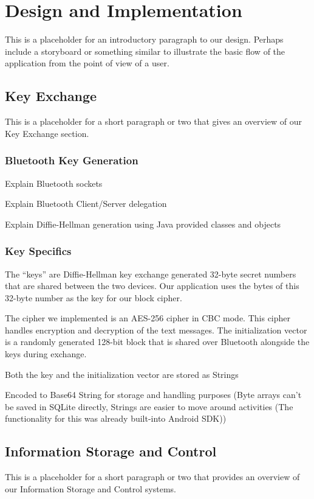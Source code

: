 \section{Design and Implementation}
This is a placeholder for an introductory paragraph to our design. Perhaps include a storyboard or something similar to illustrate the basic flow of the application
from the point of view of a user.

\subsection{Key Exchange}
This is a placeholder for a short paragraph or two that gives an overview of our Key Exchange section.

\subsubsection{Bluetooth Key Generation}
Explain Bluetooth sockets

Explain Bluetooth Client/Server delegation

Explain Diffie-Hellman generation using Java provided classes and objects

\subsubsection{Key Specifics}
The ``keys'' are Diffie-Hellman key exchange generated 32-byte secret numbers that are shared between
the two devices. Our application uses the bytes of this 32-byte number as the key for our block cipher.

The cipher we implemented is an AES-256 cipher in CBC mode. This cipher handles encryption and
decryption of the text messages. The initialization vector is a randomly generated 128-bit block that
is shared over Bluetooth alongside the keys during exchange.

Both the key and the initialization vector are stored as Strings

Encoded to Base64 String for storage and handling purposes (Byte arrays can't be saved in SQLite directly, Strings are easier to move around activities (The functionality for this was already built-into Android SDK))

\subsection{Information Storage and Control}
This is a placeholder for a short paragraph or two that provides an overview of our Information Storage and Control systems.

